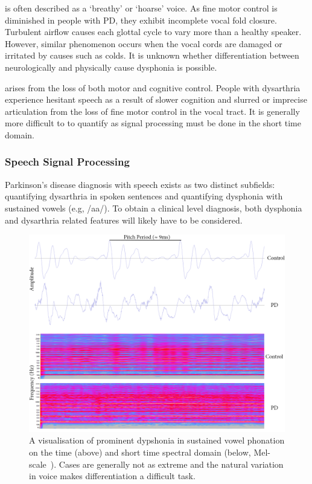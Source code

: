 \documentclass[12pt, twoside]{book}
\renewcommand\emph[1]{\textit{\color{USred}{#1}}}
\begin{document}
\emph{Dysphonia} is often described as a `breathy' or `hoarse' voice. As fine motor control is diminished in people with PD, they exhibit incomplete vocal fold closure. Turbulent airflow causes each glottal cycle to vary more than a healthy speaker. However, similar phenomenon occurs when the vocal cords are damaged or irritated by causes such as colds. It is unknown whether differentiation between neurologically and physically cause dysphonia is possible.  

\emph{Dysarthria} arises from the loss of both motor and cognitive control. People with dysarthria experience hesitant speech as a result of slower cognition and slurred or imprecise articulation from the loss of fine motor control in the vocal tract. It is generally more difficult to to quantify as signal processing must be done in the short time domain. 


\subsubsection{Speech Signal Processing}
Parkinson's disease diagnosis with speech exists as two distinct subfields: quantifying dysarthria in spoken sentences and quantifying dysphonia with sustained vowels (e.g, /aa/). To obtain a clinical level diagnosis, both dysphonia and dysarthria related features will likely have to be considered.


\begin{figure}[h]
	\label{spectrogram}
	\centering\centerline{\includegraphics[width=1.2\linewidth]{timespectrogram.png}}
	\caption{A visualisation of prominent dypshonia in sustained vowel phonation on the time (above) and short time spectral domain (below, Mel-scale~\cite{mfscale}). Cases are generally not as extreme and the natural variation in voice makes differentiation a difficult task.}
\end{figure}
\end{document}
